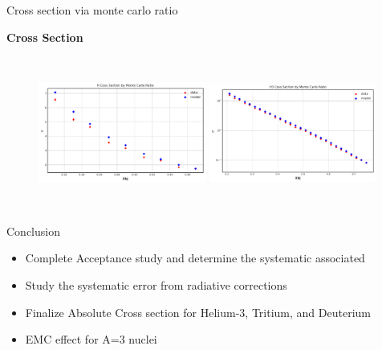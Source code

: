 \documentclass{beamer}
\begin{document}
\begin{frame}{Cross section via monte carlo ratio}
\begin{block}{\textbf{Cross Section}}
	\begin{figure}
		\hspace*{-0.5cm}\includegraphics[height=5cm,width=5.50cm]{../images/H_final.pdf}			\hspace*{0.5cm}\includegraphics[height=5cm,width=5.50cm]{../images/H3_final.pdf}
	\end{figure}
\end{block}
\end{frame}



\begin{frame}{}
	\begin{block}{Conclusion}
		\begin{itemize}
			\item Complete Acceptance study and determine the systematic associated
			\item Study the systematic error from radiative corrections
			\item Finalize Absolute Cross section for Helium-3, Tritium, and Deuterium 
			\item EMC effect for A=3 nuclei
		\end{itemize}
	\end{block}	
\end{frame}
	
	
\end{document}
